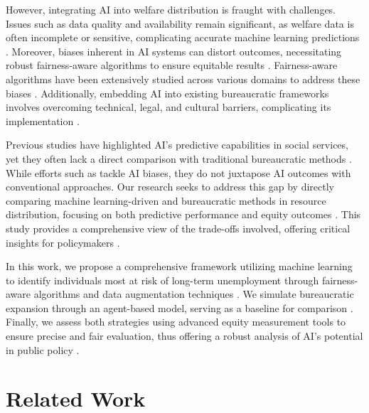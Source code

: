 \documentclass{article} %
\begin{document}
However, integrating AI into welfare distribution is fraught with challenges. Issues such as data quality and availability remain significant, as welfare data is often incomplete or sensitive, complicating accurate machine learning predictions \citep{predicting2023,forecasting2025}. Moreover, biases inherent in AI systems can distort outcomes, necessitating robust fairness-aware algorithms to ensure equitable results \citep{are2022}. Fairness-aware algorithms have been extensively studied across various domains to address these biases \citep{fairnessaware2024,fairnessaware2022,towards2023,the2018,on2024}. Additionally, embedding AI into existing bureaucratic frameworks involves overcoming technical, legal, and cultural barriers, complicating its implementation \citep{navigating2025,resource2025,bridging2024}.

Previous studies have highlighted AI's predictive capabilities in social services, yet they often lack a direct comparison with traditional bureaucratic methods \citep{a2024}. While efforts such as  tackle AI biases, they do not juxtapose AI outcomes with conventional approaches. Our research seeks to address this gap by directly comparing machine learning-driven and bureaucratic methods in resource distribution, focusing on both predictive performance and equity outcomes \citep{participation2003,supervised2024}. This study provides a comprehensive view of the trade-offs involved, offering critical insights for policymakers \citep{popularizing2023,research2024,statistical2024}.

In this work, we propose a comprehensive framework utilizing machine learning to identify individuals most at risk of long-term unemployment through fairness-aware algorithms and data augmentation techniques \citep{welfare2023,express2025,on2024}. We simulate bureaucratic expansion through an agent-based model, serving as a baseline for comparison \citep{agentbased2025,an2014}. Finally, we assess both strategies using advanced equity measurement tools to ensure precise and fair evaluation, thus offering a robust analysis of AI's potential in public policy \citep{bridging2025,simplified2016,lyapunovguided2024,f2ul2024,supervised2024}.

\section{Related Work}
\end{document}
